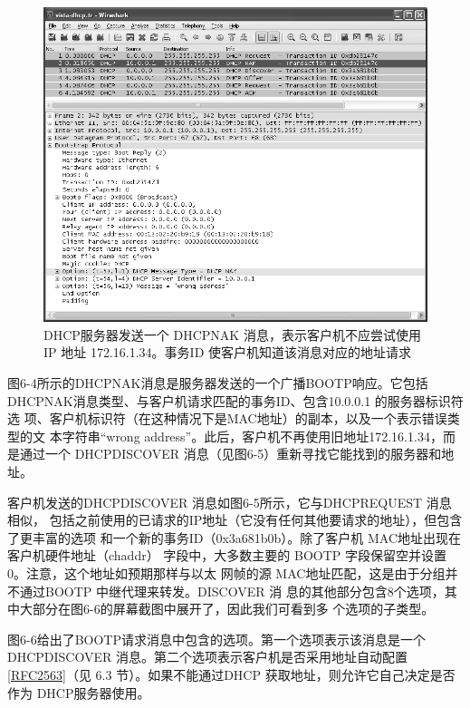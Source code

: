 \begin{figure}[H]
    \centering
	\includegraphics[scale=0.5]{imgs/6/6-4.png}
	\caption{DHCP服务器发送一个 DHCPNAK 消息，表示客户机不应尝试使用 IP 地址 172.16.1.34。事务ID 使客户机知道该消息对应的地址请求}
\end{figure}

图6-4所示的DHCPNAK消息是服务器发送的一个广播BOOTP响应。它包括
DHCPNAK消息类型、与客户机请求匹配的事务ID、包含10.0.0.1 的服务器标识符选
项、客户机标识符（在这种情况下是MAC地址）的副本，以及一个表示错误类型的文
本字符串“wrong address”。此后，客户机不再使用旧地址172.16.1.34，而是通过一个
DHCPDISCOVER 消息（见图6-5）重新寻找它能找到的服务器和地址。

客户机发送的DHCPDISCOVER 消息如图6-5所示，它与DHCPREQUEST 消息相似，
包括之前使用的已请求的IP地址（它没有任何其他要请求的地址），但包含了更丰富的选项
和一个新的事务ID（0x3a681b0b）。除了客户机 MAC地址出现在客户机硬件地址（chaddr）
字段中，大多数主要的 BOOTP 字段保留空并设置0。注意，这个地址如预期那样与以太
网帧的源 MAC地址匹配，这是由于分组并不通过BOOTP 中继代理来转发。DISCOVER 消
息的其他部分包含8个选项，其中大部分在图6-6的屏幕截图中展开了，因此我们可看到多
个选项的子类型。

图6-6给出了BOOTP请求消息中包含的选项。第一个选项表示该消息是一个
DHCPDISCOVER 消息。第二个选项表示客户机是否采用地址自动配置\href{https://www.rfc-editor.org/rfc/rfc2563}{\href{https://www.rfc-editor.org/rfc/rfc2563}{[RFC2563]}}（见 6.3
节）。如果不能通过DHCP 获取地址，则允许它自己决定是否作为 DHCP服务器使用。

